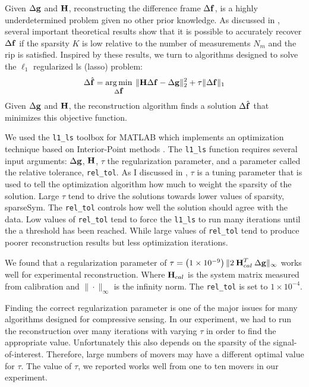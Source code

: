 Given $\Delta \displaystyle \mathbf{g}$ and $ \displaystyle \mathbf{H} $, reconstructing the difference frame $\Delta \displaystyle \mathbf{f}$, is a highly underdetermined problem given no other prior knowledge. As discussed in , several important theoretical results show that it is possible to accurately recover $\Delta \displaystyle \mathbf{f}$ if the sparsity $K$ is low relative to the number of measurements $N_m$ and the \gls{rip} is satisfied. Inspired by these results, we turn to algorithms designed to solve the $\ell_1$ regularized \gls{ls} (\gls{lasso}) problem:
%
\begin{equation}
	\Delta \hat{ \displaystyle \mathbf{f} } = \operatorname*{arg\,min}_{\Delta \displaystyle \mathbf{f}} \: \| \displaystyle \mathbf{H} \Delta \displaystyle \mathbf{f} - \Delta \displaystyle \mathbf{g} \|_{2}^{2} + \tau \| \Delta \displaystyle \mathbf{f} \|_1
	\label{eq:scoutl1regls}
\end{equation}
%
Given $\Delta \displaystyle \mathbf{g}$ and $ \displaystyle \mathbf{H} $, the reconstruction algorithm finds a solution $\Delta \hat{ \displaystyle \mathbf{f} }$ that minimizes this objective function. 


We used the \texttt{l1\_ls} toolbox for MATLAB which implements an optimization technique based on Interior-Point methods \cite{kim2007interior}. The \texttt{l1\_ls} function requires several input arguments: $\Delta \displaystyle \mathbf{g}$, $ \displaystyle \mathbf{H} $, $\tau$ the regularization parameter, and a parameter called the relative tolerance, \texttt{rel\_tol}. As I discussed in , $\tau$ is a tuning parameter that is used to tell the optimization algorithm how much to weight the sparsity of the solution. Large $\tau$ tend to drive the solutions towards lower values of sparsity, \gls{sparseSym}. The \texttt{rel\_tol} controls how well the solution should agree with the data. Low values of \texttt{rel\_tol} tend to force the \texttt{l1\_ls} to run many iterations until the a threshold has been reached. While large values of \texttt{rel\_tol} tend to produce poorer reconstruction results but less optimization iterations. 

We found that a regularization parameter of $\tau= \left( 1 \times 10^{-9} \right) \| 2 \: \displaystyle \mathbf{H}_{cal}^T \: \Delta \displaystyle \mathbf{g} \|_{\infty}$ works well for experimental reconstruction. Where $\displaystyle \mathbf{H}_{cal}$
is the system matrix measured from calibration and $\| \cdot \|_{\infty}$ is the infinity norm. The \texttt{rel\_tol} is set to $1 \times 10^{-4}$.

Finding the correct regularization parameter is one of the major issues for many algorithms designed for compressive sensing. In our experiment, we had to run the reconstruction over many iterations with varying $\tau$ in order to find the appropriate value. Unfortunately this also depends on the sparsity of the signal-of-interest. Therefore, large numbers of movers may have a different optimal value for $\tau$. The value of $\tau$, we reported works well from one to ten movers in our experiment.


